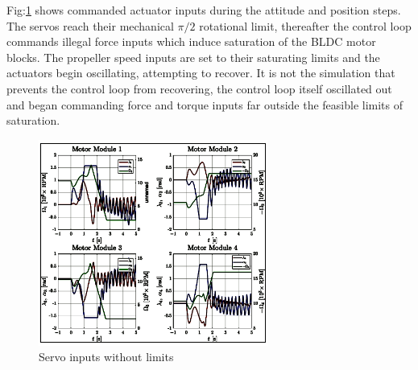 \par
Fig:\ref{fig:saturated-servos} shows commanded actuator inputs during the attitude and position steps. The servos reach their mechanical $\pi/2$ rotational limit, thereafter the control loop commands illegal force inputs which induce saturation of the BLDC motor blocks. The propeller speed inputs are set to their saturating limits and the actuators begin oscillating, attempting to recover. It is not the simulation that prevents the control loop from recovering, the control loop itself oscillated out and began commanding force and torque inputs far outside the feasible limits of saturation.
\begin{figure}[hbtp]
\vspace{-8pt}
\centering
\includegraphics[width=0.67\textwidth]{graphs/saturated-servos}
\vspace{-6pt}
\caption{Servo inputs without limits}
\label{fig:saturated-servos}
\vspace{-14pt}
\end{figure}
